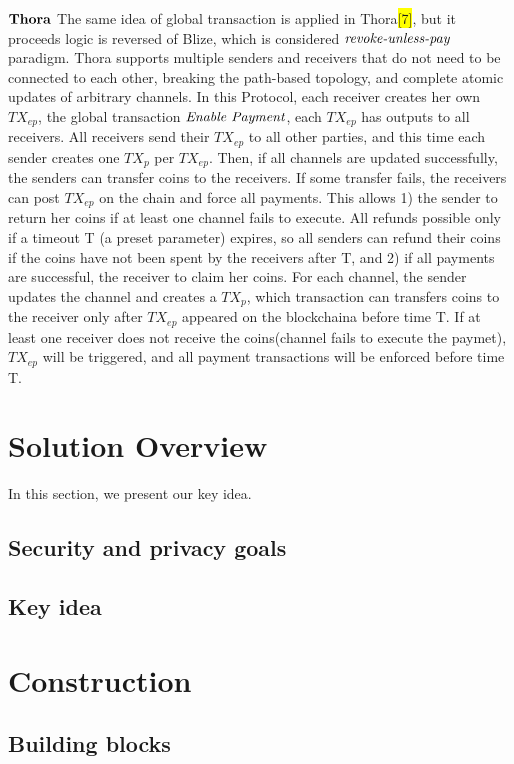 \documentclass[conference]{IEEEtran}
\begin{document}
\noindent $\bf{Thora}$   The same idea of global transaction is applied in Thora\colorbox{yellow}{[7]}, but it proceeds logic is reversed of Blize, which is considered $\emph{revoke-unless-pay}$ paradigm. Thora supports multiple senders and receivers that do not need to be connected to each other, breaking the path-based topology, and complete atomic updates of arbitrary channels. In this Protocol, each receiver creates her own $TX_{ep}$, the global transaction $\emph{Enable Payment}$, each $TX_{ep}$ has outputs to all receivers. All receivers send their $TX_{ep}$ to all other parties, and this time each sender creates 
one $TX_p$ per $TX_{ep}$. Then, if all channels are updated successfully, the senders can transfer coins to the receivers. If some transfer fails, the receivers can post $TX_{ep}$ on the chain and force all payments. This allows 1) the sender to return her coins if at least one channel fails to execute. All refunds possible only if a timeout T (a preset parameter) expires, so all senders can refund their coins if the coins have not been spent by the receivers after T, and 2) if all payments are successful, the receiver to claim her coins. For each channel, the sender updates the channel and creates a $TX_p$, which transaction can transfers coins to the receiver only after $TX_{ep}$ appeared on the blockchaina before time T. If at least one receiver does not receive the coins(channel fails to execute the paymet), $TX_{ep}$ will be triggered, and all payment transactions will be enforced before time T.

\section{Solution Overview}
In this section, we present our key idea.

\subsection{Security and privacy goals}

\subsection{Key idea}

\section{Construction}

\subsection{Building blocks}
\end{document}
